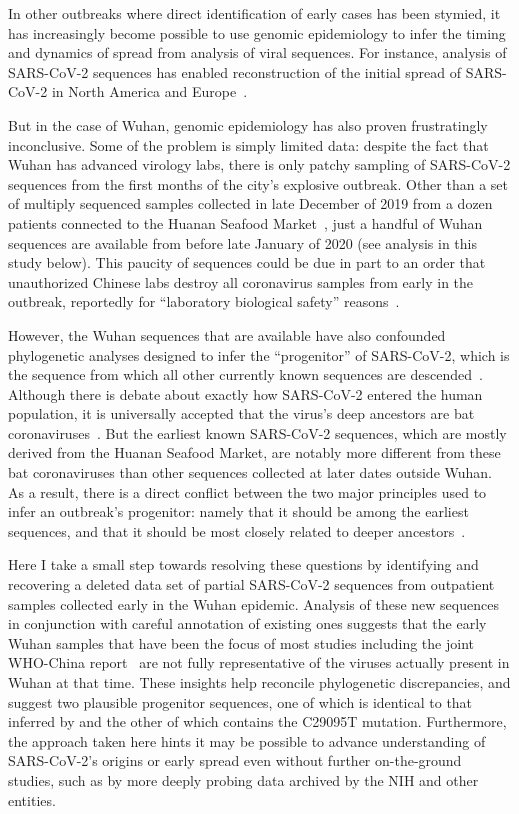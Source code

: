 \documentclass[9pt,twocolumn,twoside]{gsajnl_modified}
\begin{document}
In other outbreaks where direct identification of early cases has been stymied, it has increasingly become possible to use genomic epidemiology to infer the timing and dynamics of spread from analysis of viral sequences.
For instance, analysis of SARS-CoV-2 sequences has enabled reconstruction of the initial spread of SARS-CoV-2 in North America and Europe~\citep{bedford2020cryptic, worobey2020emergence, deng2020genomic, fauver2020coast}.

But in the case of Wuhan, genomic epidemiology has also proven frustratingly inconclusive.
Some of the problem is simply limited data: despite the fact that Wuhan has advanced virology labs, there is only patchy sampling of SARS-CoV-2 sequences from the first months of the city's explosive outbreak.
Other than a set of multiply sequenced samples collected in late December of 2019 from a dozen patients connected to the Huanan Seafood Market~\citep{WHO2021origins}, just a handful of Wuhan sequences are available from before late January of 2020 (see analysis in this study below).
This paucity of sequences could be due in part to an order that unauthorized Chinese labs destroy all coronavirus samples from early in the outbreak, reportedly for ``laboratory biological safety'' reasons~\citep{pinghui2020SCMP}.

However, the Wuhan sequences that are available have also confounded phylogenetic analyses designed to infer the ``progenitor'' of SARS-CoV-2, which is the sequence from which all other currently known sequences are descended~\citep{kumar2021evolutionary}.
Although there is debate about exactly how SARS-CoV-2 entered the human population, it is universally accepted that the virus's deep ancestors are bat coronaviruses~\citep{lytras2021exploring}.
But the earliest known SARS-CoV-2 sequences, which are mostly derived from the Huanan Seafood Market, are notably more different from these bat coronaviruses than other sequences collected at later dates outside Wuhan.
As a result, there is a direct conflict between the two major principles used to infer an outbreak's progenitor: namely that it should be among the earliest sequences, and that it should be most closely related to deeper ancestors~\citep{pipes2021assessing}.

Here I take a small step towards resolving these questions by identifying and recovering a deleted data set of partial SARS-CoV-2 sequences from outpatient samples collected early in the Wuhan epidemic.
Analysis of these new sequences in conjunction with careful annotation of existing ones suggests that the early Wuhan samples that have been the focus of most studies including the joint WHO-China report~\citep{WHO2021origins} are not fully representative of the viruses actually present in Wuhan at that time.
These insights help reconcile phylogenetic discrepancies, and suggest two plausible progenitor sequences, one of which is identical to that inferred by \citet{kumar2021evolutionary} and the other of which contains the C29095T mutation.
Furthermore, the approach taken here hints it may be possible to advance understanding of SARS-CoV-2's origins or early spread even without further on-the-ground studies, such as by more deeply probing data archived by the NIH and other entities.
\end{document}
